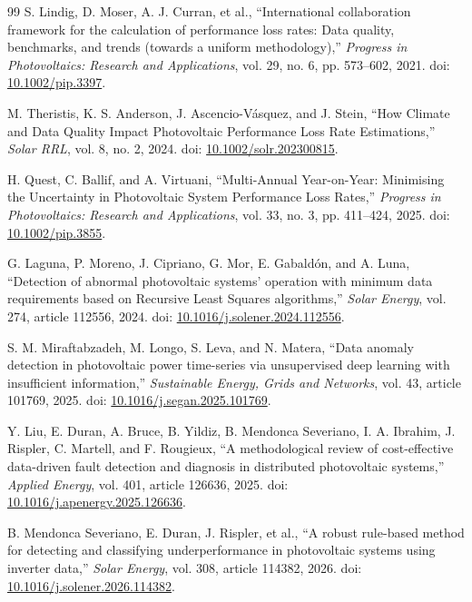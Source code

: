 \documentclass[preprint,12pt]{elsarticle}
\begin{document}
\begin{thebibliography}{99}
 S. Lindig, D. Moser, A. J. Curran, et al., ``International collaboration framework for the calculation of performance loss rates: Data quality, benchmarks, and trends (towards a uniform methodology),'' \emph{Progress in Photovoltaics: Research and Applications}, vol. 29, no. 6, pp. 573--602, 2021. doi: \href{https://doi.org/10.1002/pip.3397}{10.1002/pip.3397}.

 M. Theristis, K. S. Anderson, J. Ascencio-V\'{a}squez, and J. Stein, ``How Climate and Data Quality Impact Photovoltaic Performance Loss Rate Estimations,'' \emph{Solar RRL}, vol. 8, no. 2, 2024. doi: \href{https://doi.org/10.1002/solr.202300815}{10.1002/solr.202300815}.

 H. Quest, C. Ballif, and A. Virtuani, ``Multi-Annual Year-on-Year: Minimising the Uncertainty in Photovoltaic System Performance Loss Rates,'' \emph{Progress in Photovoltaics: Research and Applications}, vol. 33, no. 3, pp. 411--424, 2025. doi: \href{https://doi.org/10.1002/pip.3855}{10.1002/pip.3855}.

 G. Laguna, P. Moreno, J. Cipriano, G. Mor, E. Gabald\'{o}n, and A. Luna, ``Detection of abnormal photovoltaic systems' operation with minimum data requirements based on Recursive Least Squares algorithms,'' \emph{Solar Energy}, vol. 274, article 112556, 2024. doi: \href{https://doi.org/10.1016/j.solener.2024.112556}{10.1016/j.solener.2024.112556}.

 S. M. Miraftabzadeh, M. Longo, S. Leva, and N. Matera, ``Data anomaly detection in photovoltaic power time-series via unsupervised deep learning with insufficient information,'' \emph{Sustainable Energy, Grids and Networks}, vol. 43, article 101769, 2025. doi: \href{https://doi.org/10.1016/j.segan.2025.101769}{10.1016/j.segan.2025.101769}.

 Y. Liu, E. Duran, A. Bruce, B. Yildiz, B. Mendonca Severiano, I. A. Ibrahim, J. Rispler, C. Martell, and F. Rougieux, ``A methodological review of cost-effective data-driven fault detection and diagnosis in distributed photovoltaic systems,'' \emph{Applied Energy}, vol. 401, article 126636, 2025. doi: \href{https://doi.org/10.1016/j.apenergy.2025.126636}{10.1016/j.apenergy.2025.126636}.

 B. Mendonca Severiano, E. Duran, J. Rispler, et al., ``A robust rule-based method for detecting and classifying underperformance in photovoltaic systems using inverter data,'' \emph{Solar Energy}, vol. 308, article 114382, 2026. doi: \href{https://doi.org/10.1016/j.solener.2026.114382}{10.1016/j.solener.2026.114382}.


\end{thebibliography}
\end{document}
